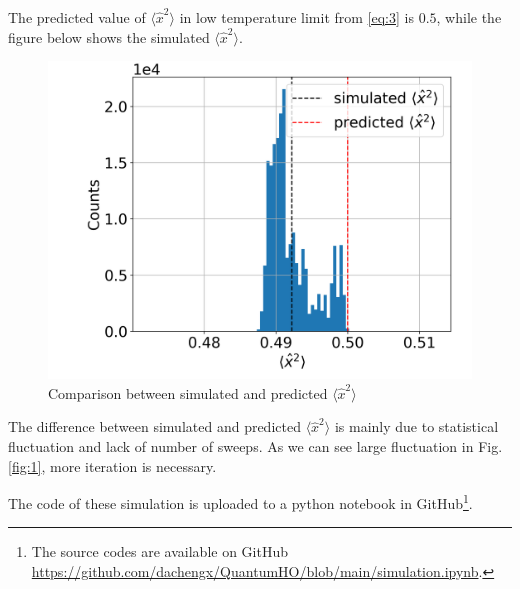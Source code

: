 The predicted value of $\langle\hat{x}^2\rangle$ in low temperature limit from \ref{eq:3} is $0.5$, while the figure below shows the simulated $\langle\hat{x}^2\rangle$.

\begin{figure}
    \centering
    \includegraphics[width=0.6\linewidth]{figures/x2_hist.png}
    \caption{Comparison between simulated and predicted $\langle\hat{x}^2\rangle$}
\end{figure}

The difference between simulated and predicted $\langle\hat{x}^2\rangle$ is mainly due to statistical fluctuation and lack of number of sweeps. As we can see large fluctuation in Fig. \ref{fig:1}, more iteration is necessary. 

The code of these simulation is uploaded to a python notebook in GitHub\footnote{The source codes are available on GitHub \url{https://github.com/dachengx/QuantumHO/blob/main/simulation.ipynb}.}.
